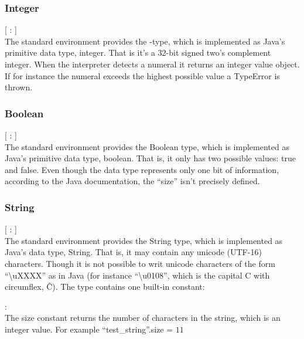 \subsubsection{Integer}

\begin{dlist}
  \item {}[ : ]\\
    The standard environment provides the -type, which is implemented as Java's primitive data type, integer. That is
it's a 32-bit signed two's complement integer. When the interpreter detects a numeral it returns an integer value object. If
for instance the numeral exceeds the highest possible value a TypeError is thrown.
\end{dlist}

\subsubsection{Boolean}

\begin{dlist}
  \item {}[ : ]\\
  The standard environment provides the Boolean type, which is implemented as Java's primitive data type, boolean. That is, it only has two possible values: true and false. Even though the data type represents only one bit of information, according to the Java documentation, the ``size'' isn't precisely defined. 
\end{dlist}

\subsubsection{String}
\begin{dlist}
  \item {}[ : ]\\
    The standard environment provides the String type, which is implemented as Java's data type, String. That is, it may contain any unicode (UTF-16) characters. Though it is not possible to writ unicode characters of the form ``\textbackslash{}uXXXX'' as in Java (for instance ``\textbackslash{}u0108'', which is the capital C with circumflex, Ĉ). The  type contains one built-in constant:  
  \begin{dlist}
  \item {} : \\
  The size constant returns the number of characters in the string, which is an integer value. For example ``test\_string''.size = $11$
  \end{dlist}
\end{dlist}
